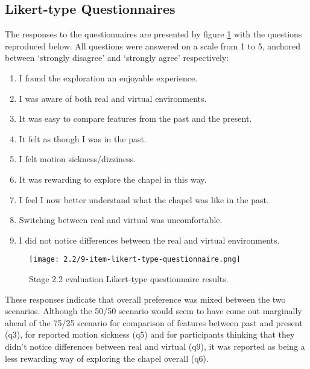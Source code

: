 
\subsection{Likert-type Questionnaires}

The responses to the questionnaires are presented by figure \ref{9-item-likert-type-questionnaire.png} with the questions reproduced below. All questions were answered on a scale from 1 to 5, anchored between `strongly disagree' and `strongly agree' respectively:
\begin{enumerate}
	\item I found the exploration an enjoyable experience.
	\item I was aware of both real and virtual environments.
	\item It was easy to compare features from the past and the present.
	\item It felt as though I was in the past.
	\item I felt motion sickness/dizziness.
	\item It was rewarding to explore the chapel in this way.
	\item I feel I now better understand what the chapel was like in the past.
	\item Switching between real and virtual was uncomfortable.
	\item I did not notice differences between the real and virtual environments.
\end{enumerate}

\begin{figure}[h]
	\begin{center}
	\texttt{[image: 2.2/9-item-likert-type-questionnaire.png]}
	\caption{Stage 2.2 evaluation Likert-type questionnaire results.}
	\label{9-item-likert-type-questionnaire.png}
	\end{center}
\end{figure}

These responses indicate that overall preference was mixed between the two scenarios. Although the 50/50 scenario would seem to have come out marginally ahead of the 75/25 scenario for comparison of features between past and present (q3), for reported motion sickness (q5) and for participants thinking that they didn't notice differences between real and virtual (q9), it was reported as being a less rewarding way of exploring the chapel overall (q6).

